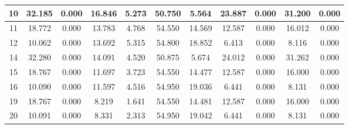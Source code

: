 \begin{table}[]
\begin{tabular}{|c|cc|cc|cc|cc|cc|}
10 & 32.185 & \cellcolor[HTML]{EFEFEF}0.000 & 16.846 & \cellcolor[HTML]{EFEFEF}5.273 & 50.750 & \cellcolor[HTML]{EFEFEF}5.564 & 23.887 & \cellcolor[HTML]{EFEFEF}0.000 & 31.200 & \cellcolor[HTML]{EFEFEF}0.000 \\ \hline
11 & 18.772 & \cellcolor[HTML]{EFEFEF}0.000 & 13.783 & \cellcolor[HTML]{EFEFEF}4.768 & 54.550 & \cellcolor[HTML]{EFEFEF}14.569 & 12.587 & \cellcolor[HTML]{EFEFEF}0.000 & 16.012 & \cellcolor[HTML]{EFEFEF}0.000 \\ \hline
12 & 10.062 & \cellcolor[HTML]{EFEFEF}0.000 & 13.692 & \cellcolor[HTML]{EFEFEF}5.315 & 54.800 & \cellcolor[HTML]{EFEFEF}18.852 & 6.413 & \cellcolor[HTML]{EFEFEF}0.000 & 8.116 & \cellcolor[HTML]{EFEFEF}0.000 \\ \hline
14 & 32.280 & \cellcolor[HTML]{EFEFEF}0.000 & 14.091 & \cellcolor[HTML]{EFEFEF}4.520 & 50.875 & \cellcolor[HTML]{EFEFEF}5.674 & 24.012 & \cellcolor[HTML]{EFEFEF}0.000 & 31.262 & \cellcolor[HTML]{EFEFEF}0.000 \\ \hline
15 & 18.767 & \cellcolor[HTML]{EFEFEF}0.000 & 11.697 & \cellcolor[HTML]{EFEFEF}3.723 & 54.550 & \cellcolor[HTML]{EFEFEF}14.477 & 12.587 & \cellcolor[HTML]{EFEFEF}0.000 & 16.000 & \cellcolor[HTML]{EFEFEF}0.000 \\ \hline
16 & 10.090 & \cellcolor[HTML]{EFEFEF}0.000 & 11.597 & \cellcolor[HTML]{EFEFEF}4.516 & 54.950 & \cellcolor[HTML]{EFEFEF}19.036 & 6.441 & \cellcolor[HTML]{EFEFEF}0.000 & 8.131 & \cellcolor[HTML]{EFEFEF}0.000 \\ \hline
19 & 18.767 & \cellcolor[HTML]{EFEFEF}0.000 & 8.219 & \cellcolor[HTML]{EFEFEF}1.641 & 54.550 & \cellcolor[HTML]{EFEFEF}14.481 & 12.587 & \cellcolor[HTML]{EFEFEF}0.000 & 16.000 & \cellcolor[HTML]{EFEFEF}0.000 \\ \hline
20 & 10.091 & \cellcolor[HTML]{EFEFEF}0.000 & 8.331 & \cellcolor[HTML]{EFEFEF}2.313 & 54.950 & \cellcolor[HTML]{EFEFEF}19.042 & 6.441 & \cellcolor[HTML]{EFEFEF}0.000 & 8.131 & \cellcolor[HTML]{EFEFEF}0.000 \\ \hline
\end{tabular}
\end{table}
